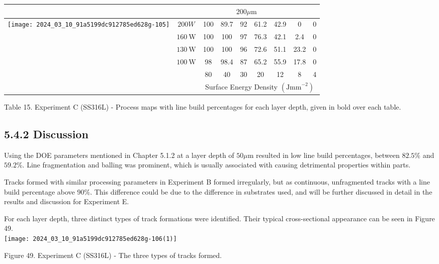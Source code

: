 \documentclass[10pt]{article}
\begin{document}
\begin{center}
\begin{tabular}{|c|c|c|c|c|c|c|c|c|}
\hline
 & \multicolumn{8}{|c|}{$200 \mu \mathrm{m}$} \\
\hline
\multirow{4}{*}{\texttt{[image: 2024\_03\_10\_91a5199dc912785ed628g-105]}
} & $200 W$ & 100 & 89.7 & 92 & 61.2 & 42.9 & 0 & 0 \\
\hline
 & $160 \mathrm{~W}$ & 100 & 100 & 97 & 76.3 & 42.1 & 2.4 & 0 \\
\hline
 & $130 \mathrm{~W}$ & 100 & 100 & 96 & 72.6 & 51.1 & 23.2 & 0 \\
\hline
 & $100 \mathrm{~W}$ & 98 & 98.4 & 87 & 65.2 & 55.9 & 17.8 & 0 \\
\hline
 &  & 80 & 40 & 30 & 20 & 12 & 8 & 4 \\
\hline
 &  & \multicolumn{7}{|c|}{Surface Energy Density $\left(\mathrm{Jmm}^{-2}\right)$} \\
\hline
\end{tabular}
\end{center}

Table 15. Experiment C (SS316L) - Process maps with line build percentages for each layer depth, given in bold over each table.

\subsection*{5.4.2 Discussion}
Using the DOE parameters mentioned in Chapter 5.1.2 at a layer depth of $50 \mu \mathrm{m}$ resulted in low line build percentages, between $82.5 \%$ and $59.2 \%$. Line fragmentation and balling was prominent, which is usually associated with causing detrimental properties within parts.

Tracks formed with similar processing parameters in Experiment B formed irregularly, but as continuous, unfragmented tracks with a line build percentage above $90 \%$. This difference could be due to the difference in substrates used, and will be further discussed in detail in the results and discussion for Experiment E.

For each layer depth, three distinct types of track formations were identified. Their typical cross-sectional appearance can be seen in Figure 49.\\
\texttt{[image: 2024\_03\_10\_91a5199dc912785ed628g-106(1)]}

Figure 49. Experiment C (SS316L) - The three types of tracks formed.
\end{document}
